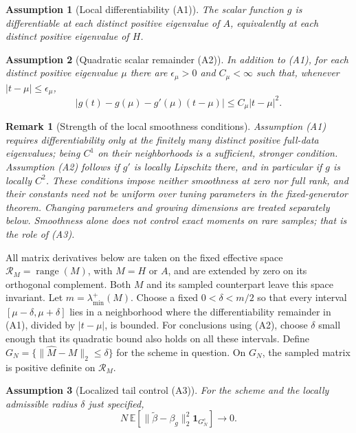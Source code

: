 \documentclass[pdflatex,iicol,sn-mathphys-ay]{sn-jnl}
\theoremstyle{thmstyleone}
\theoremstyle{thmstylethree}
\newtheorem{assumption}{Assumption}
\theoremstyle{thmstyletwo}
\newtheorem{remark}{Remark}
\newcommand{\E}{\mathbb E}
\begin{document}
\begin{assumption}[Local differentiability (A1)]\label{ass:local_first}
The scalar function $g$ is differentiable at each distinct positive
eigenvalue of $A$, equivalently at each distinct positive eigenvalue of $H$.
\end{assumption}

\begin{assumption}[Quadratic scalar remainder (A2)]\label{ass:local_second}
In addition to (A1), for each distinct positive eigenvalue $\mu$ there are
$\epsilon_\mu>0$ and $C_\mu<\infty$ such that, whenever
$|t-\mu|\le\epsilon_\mu$,
\[
 |g(t)-g(\mu)-g'(\mu)(t-\mu)|\le C_\mu|t-\mu|^2.
\]
\end{assumption}

\begin{remark}[Strength of the local smoothness conditions]
Assumption (A1) requires differentiability only at the finitely many distinct
positive full-data eigenvalues; being $C^1$ on their neighborhoods is a
sufficient, stronger condition. Assumption (A2) follows if $g'$ is locally
Lipschitz there, and in particular if $g$ is locally $C^2$.
These conditions impose neither smoothness at zero nor full rank, and their
constants need not be uniform over tuning parameters in the fixed-generator
theorem. Changing parameters and growing dimensions are treated separately
below. Smoothness alone does not control exact moments on rare samples;
that is the role of (A3).
\end{remark}

All matrix derivatives below are taken on the fixed effective space
$\mathcal R_M=\operatorname{range}(M)$, with $M=H$ or $A$, and are extended
by zero on its orthogonal complement. Both $M$ and its sampled counterpart
leave this space invariant. Let $m=\lambda_{\min}^+(M)$.
Choose a fixed $0<\delta<m/2$ so that every interval
$[\mu-\delta,\mu+\delta]$ lies in a neighborhood where the differentiability
remainder in (A1), divided by $|t-\mu|$, is bounded.
For conclusions using (A2), choose $\delta$ small enough that its quadratic
bound also holds on all these intervals.
Define $G_N=\{\|\widehat M-M\|_2\le\delta\}$ for the scheme in question.
On $G_N$, the sampled matrix is positive definite on $\mathcal R_M$.

\begin{assumption}[Localized tail control (A3)]\label{ass:fixed_tail}
For the scheme and the locally admissible radius $\delta$ just specified,
\[
 N\,\E\!\left[\|\widetilde\beta-\beta_g\|_2^2
                 \mathbf{1}_{G_N^c}\right]\longrightarrow0.
\]
\end{assumption}
\end{document}
